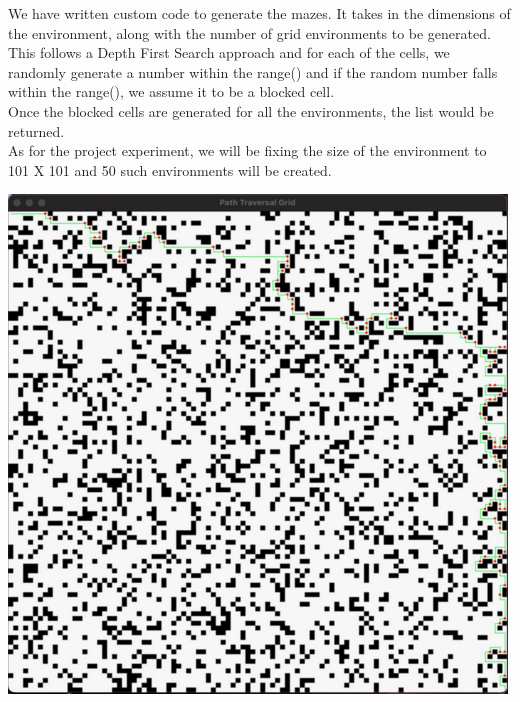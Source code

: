 \documentclass{article}
\begin{document}
\begin{flushleft}
We have written custom code to generate the mazes. It takes in the dimensions of the environment, along with the number of grid environments to be generated. This follows a Depth First Search approach and for each of the cells, we randomly generate a number within the range() and if the random number falls within the range(), we assume it to be a blocked cell. \\
Once the blocked cells are generated for all the environments, the list would be returned. \\
As for the project experiment, we will be fixing the size of the environment to 101 X 101 and 50 such environments will be created.
\end{flushleft}
\includegraphics{grid.png}
\end{document}
